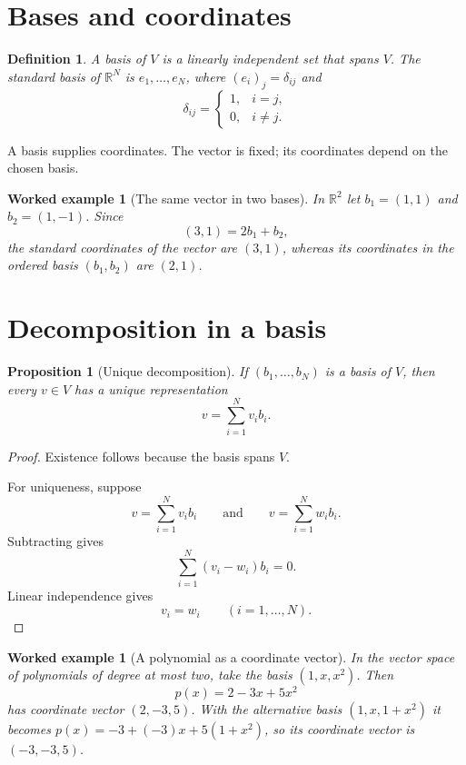\documentclass[11pt,a5paper,oneside,openany]{scrreprt}
\theoremstyle{notes}
\newtheorem{proposition}[theorem]{Proposition}
\theoremstyle{definitions}
\newtheorem{definition}[theorem]{Definition}
\newtheorem{example}[theorem]{Worked example}
\newcommand{\R}{\mathbb{R}}
\begin{document}
\section{Bases and coordinates}

\begin{definition}
A basis of $V$ is a linearly independent set that spans $V$.  The standard
basis of $\R^N$ is $e_1,\ldots,e_N$, where $(e_i)_j=\delta_{ij}$ and
\[
  \delta_{ij}=\begin{cases}1,&i=j,\\0,&i\ne j.\end{cases}
\]
\end{definition}

A basis supplies coordinates.  The vector is fixed; its coordinates depend on
the chosen basis.

\begin{example}[The same vector in two bases]
In $\R^2$ let $b_1=(1,1)$ and $b_2=(1,-1)$.  Since
\[
  (3,1)=2b_1+b_2,
\]
the standard coordinates of the vector are $(3,1)$, whereas its coordinates
in the ordered basis $(b_1,b_2)$ are $(2,1)$.
\end{example}

\section{Decomposition in a basis}

\begin{proposition}[Unique decomposition]
If $(b_1,\ldots,b_N)$ is a basis of $V$, then every $v\in V$ has a unique
representation
\[
  \boxed{v=\sum_{i=1}^{N}v_i b_i}.
\]
\end{proposition}

\begin{proof}
Existence follows because the basis spans $V$.

For uniqueness, suppose
\[
  v=\sum_{i=1}^{N}v_i b_i
  \qquad\text{and}\qquad
  v=\sum_{i=1}^{N}w_i b_i.
\]
Subtracting gives
\[
  \sum_{i=1}^{N}(v_i-w_i)b_i=0.
\]
Linear independence gives
\[
  v_i=w_i\qquad(i=1,\ldots,N).
\]
\end{proof}

\begin{example}[A polynomial as a coordinate vector]
In the vector space of polynomials of degree at most two, take the basis
$(1,x,x^2)$.  Then
\[
  p(x)=2-3x+5x^2
\]
has coordinate vector $(2,-3,5)$.  With the alternative basis
$(1,x,1+x^2)$ it becomes $p(x)=-3+(-3)x+5(1+x^2)$, so its coordinate vector
is $(-3,-3,5)$.
\end{example}
\end{document}
